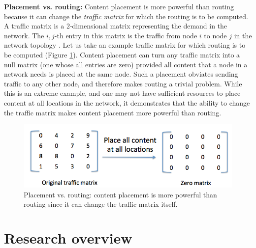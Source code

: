 

\textbf{Placement vs. routing:} Content placement is more powerful than routing because it can change the \emph{traffic matrix} for which the routing is to be computed. A traffic matrix is a 2-dimensional matrix representing the demand in the network. The $i,j$-th entry in this matrix is the traffic from node $i$ to node $j$ in the network topology \cite{fortz2000internet}.  Let us take an example traffic matrix for which routing is to be computed (Figure \ref{fig:placement-routing}). Content placement can turn any traffic matrix into a null matrix (one whose all entries are zero) provided all content that a node in a network needs is placed at the same node. Such a placement obviates sending traffic to any other node, and therefore makes routing a trivial problem. While this is an extreme example, and one may not have sufficient resources to place content at all locations in the network, it demonstrates that the ability to change the traffic matrix makes content placement more powerful than routing.

\begin{figure}
	\centering
	\includegraphics[scale=0.4]{fig/placement-vs-routing.png}
	\caption{Placement vs. routing: content placement is more powerful than routing since it can change the  traffic matrix itself.}
	\label{fig:placement-routing}
\end{figure}

\section{Research overview}

